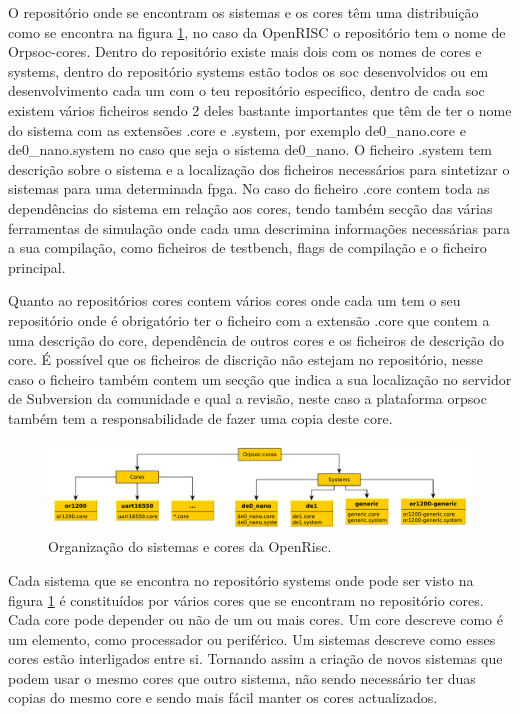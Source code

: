 O repositório onde se encontram os sistemas e os cores têm uma distribuição como se encontra na figura \ref{grafos:orpsoc}, no caso da OpenRISC o repositório tem o nome de Orpsoc-cores. Dentro do repositório existe mais dois com os nomes de cores e systems, dentro do repositório systems estão todos os \acrshort{soc} desenvolvidos ou em desenvolvimento cada um com o teu repositório especifico, dentro de cada \acrshort{soc} existem vários ficheiros sendo 2 deles bastante importantes que têm de ter o nome do sistema com as extensões .core e .system, por exemplo de0\_nano.core e de0\_nano.system no caso que seja o sistema de0\_nano. O ficheiro .system tem descrição sobre o sistema e a localização dos ficheiros necessários para sintetizar o sistemas para uma determinada \acrshort{fpga}. No caso do ficheiro .core contem toda as dependências do sistema em relação aos cores, tendo também secção das várias ferramentas de simulação onde cada uma descrimina informações necessárias para a sua compilação, como ficheiros de testbench, flags de compilação e o ficheiro principal.

Quanto ao repositórios cores contem vários cores onde cada um tem o seu repositório onde é obrigatório ter o ficheiro com a extensão .core que contem a uma descrição do core, dependência de outros cores e os ficheiros de descrição do core. É possível que os ficheiros de discrição não estejam no repositório, nesse caso o ficheiro também contem um secção que indica a sua localização no servidor de Subversion da comunidade e qual a revisão, neste caso a plataforma \acrlong{orpsoc} também tem a responsabilidade de fazer uma copia deste core. 


\begin{figure}[!htb]
  \centering
  \includegraphics[width=1.0\textwidth]{grafos/orpsoc-cores.pdf} %
  \caption[Organização do sistemas e cores da OpenRisc]{Organização do sistemas e cores da OpenRisc.}
  \label{grafos:orpsoc}
\end{figure} 

Cada sistema que se encontra no repositório systems onde pode ser visto na figura \ref{grafos:orpsoc} é constituídos por vários cores que se encontram no repositório cores. Cada core pode depender ou não de um ou mais cores. Um core descreve como é um elemento, como processador ou periférico. Um sistemas descreve como esses cores estão interligados entre si. Tornando assim a criação de novos sistemas que podem usar o mesmo cores que outro sistema, não sendo necessário ter duas copias do mesmo core e sendo mais fácil manter os cores actualizados.

